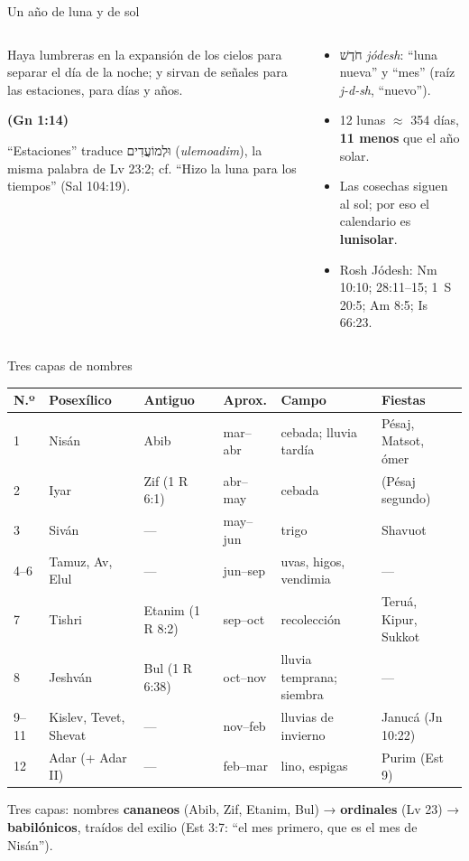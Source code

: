 \documentclass[hyperref={bookmarks=false},aspectratio=169]{beamer}
\newcommand{\heb}[1]{\mbox{\foreignlanguage{hebrew}{#1}}}
\newcommand{\fuente}[1]{\par\hfill{\upshape\bfseries\footnotesize\textcolor{tierraroja}{#1}}}
\newcommand{\destacar}[1]{\textbf{\textcolor{tierraroja}{#1}}}
\begin{document}
\begin{frame}{Un año de luna y de sol}
\begin{columns}[c,onlytextwidth]
\begin{column}{0.52\textwidth}
\begin{cita}Haya lumbreras en la expansión de los cielos para separar el día de la noche; y sirvan de señales para las estaciones, para días y años.\fuente{(Gn 1:14)}\end{cita}
\scriptsize ``Estaciones'' traduce \heb{וּלְמוֹעֲדִים} (\emph{ulemoadim}), la misma palabra de Lv 23:2; cf. ``Hizo la luna para los tiempos'' (Sal 104:19).
\end{column}
\begin{column}{0.46\textwidth}\small
\begin{itemize}
\item \heb{חֹדֶשׁ} \emph{jódesh}: ``luna nueva'' y ``mes'' (raíz \emph{j-d-sh}, ``nuevo'').
\item 12 lunas $\approx$ 354 días, \destacar{11 menos} que el año solar.
\item Las cosechas siguen al sol; por eso el calendario es \destacar{lunisolar}.
\item Rosh Jódesh: Nm 10:10; 28:11--15; 1~S 20:5; Am 8:5; Is 66:23.
\end{itemize}
\end{column}
\end{columns}
\end{frame}

\begin{frame}{Tres capas de nombres}
\scriptsize\renewcommand{\arraystretch}{1.05}
\begin{tabular}{@{}L{0.5cm}L{1.5cm}L{1.6cm}L{1.3cm}L{3.0cm}L{3.3cm}@{}}
\toprule
\textbf{N.º} & \textbf{Posexílico} & \textbf{Antiguo} & \textbf{Aprox.} & \textbf{Campo} & \textbf{Fiestas} \\  & Nisán & Abib & mar--abr & cebada; lluvia tardía & Pésaj, Matsot, ómer \\
2 & Iyar & Zif (1 R 6:1) & abr--may & cebada & (Pésaj segundo) \\
3 & Siván & --- & may--jun & trigo & Shavuot \\
4--6 & Tamuz, Av, Elul & --- & jun--sep & uvas, higos, vendimia & --- \\
7 & Tishri & Etanim (1 R 8:2) & sep--oct & recolección & Teruá, Kipur, Sukkot \\
8 & Jeshván & Bul (1 R 6:38) & oct--nov & lluvia temprana; siembra & --- \\
9--11 & Kislev, Tevet, Shevat & --- & nov--feb & lluvias de invierno & Janucá (Jn 10:22) \\
12 & Adar (+ Adar II) & --- & feb--mar & lino, espigas & Purim (Est 9) \\
\bottomrule
\end{tabular}\par\smallskip
\small Tres capas: nombres \destacar{cananeos} (Abib, Zif, Etanim, Bul) → \destacar{ordinales} (Lv 23) → \destacar{babilónicos}, traídos del exilio (Est 3:7: ``el mes primero, que es el mes de Nisán'').
\end{frame}
\end{document}
